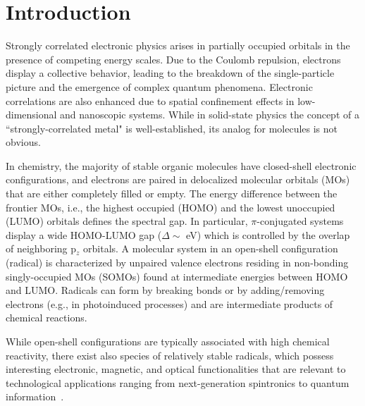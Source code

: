\documentclass[aps,prx,twocolumn,superscriptaddress]{revtex4-2}
\begin{document}



\section{Introduction}

Strongly correlated electronic physics arises in partially occupied orbitals 
in the presence of competing energy scales. 
Due to the Coulomb repulsion, electrons %
display a collective behavior, 
leading to the breakdown of the single-particle picture and the emergence of complex quantum phenomena. 
Electronic correlations are also enhanced 
due to spatial confinement effects in low-dimensional and nanoscopic systems. 
While in solid-state physics the concept of a ``strongly-correlated metal" is well-established,   
its analog for molecules is not obvious. 

In chemistry, the majority of stable organic molecules have closed-shell electronic configurations, 
and electrons are paired in delocalized molecular orbitals (MOs) that are either completely filled or empty. 
The energy difference between the frontier MOs, 
i.e., the highest occupied (HOMO) and the lowest unoccupied (LUMO) 
orbitals defines the spectral gap. 
In particular, $\pi$-conjugated systems display a wide HOMO-LUMO gap ($\Delta \sim$ eV) 
which is controlled by the overlap of neighboring p$_z$ orbitals. 
A molecular system in an open-shell configuration (radical) 
is characterized by unpaired valence electrons 
residing in non-bonding singly-occupied MOs (SOMOs) 
found at intermediate energies between HOMO and LUMO. 
Radicals can form by breaking bonds or by adding/removing electrons 
(e.g., in photoinduced processes) and are intermediate products of chemical reactions. 

While open-shell configurations are typically associated with high chemical reactivity, 
there exist also species of relatively stable radicals, 
which possess interesting electronic, magnetic, and optical functionalities 
that are relevant to technological applications 
ranging from next-generation spintronics to quantum information~\cite{sanvitoCSR40,zengChem7,chenChem7}. 
\end{document}
